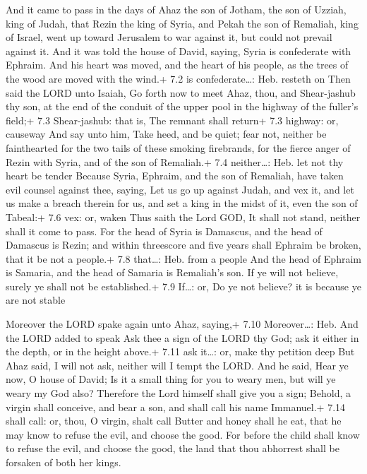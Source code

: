  And it came to pass in the days of Ahaz the son of Jotham,
the son of Uzziah, king of Judah, that Rezin the king of Syria, and
Pekah the son of Remaliah, king of Israel, went up toward Jerusalem to
war against it, but could not prevail against it.  And it
was told the house of David, saying, Syria is confederate with Ephraim.
And his heart was moved, and the heart of his people, as the trees of
the wood are moved with the wind.+ 7.2 is confederate\ldots: Heb.
resteth on  Then said the LORD unto Isaiah, Go forth now to
meet Ahaz, thou, and Shear-jashub thy son, at the end of the conduit of
the upper pool in the highway of the fuller's field;+ 7.3 Shear-jashub:
that is, The remnant shall return+ 7.3 highway: or, causeway
 And say unto him, Take heed, and be quiet; fear not,
neither be fainthearted for the two tails of these smoking firebrands,
for the fierce anger of Rezin with Syria, and of the son of Remaliah.+
7.4 neither\ldots: Heb. let not thy heart be tender  Because
Syria, Ephraim, and the son of Remaliah, have taken evil counsel against
thee, saying,  Let us go up against Judah, and vex it, and
let us make a breach therein for us, and set a king in the midst of it,
even the son of Tabeal:+ 7.6 vex: or, waken  Thus saith the
Lord GOD, It shall not stand, neither shall it come to pass.
 For the head of Syria is Damascus, and the head of Damascus
is Rezin; and within threescore and five years shall Ephraim be broken,
that it be not a people.+ 7.8 that\ldots: Heb. from a people
 And the head of Ephraim is Samaria, and the head of Samaria
is Remaliah's son. If ye will not believe, surely ye shall not be
established.+ 7.9 If\ldots: or, Do ye not believe? it is because ye are
not stable

 Moreover the LORD spake again unto Ahaz, saying,+ 7.10
Moreover\ldots: Heb. And the LORD added to speak  Ask thee
a sign of the LORD thy God; ask it either in the depth, or in the height
above.+ 7.11 ask it\ldots: or, make thy petition deep  But
Ahaz said, I will not ask, neither will I tempt the LORD. 
And he said, Hear ye now, O house of David; Is it a small thing for you
to weary men, but will ye weary my God also?  Therefore the
Lord himself shall give you a sign; Behold, a virgin shall conceive, and
bear a son, and shall call his name Immanuel.+ 7.14 shall call: or,
thou, O virgin, shalt call  Butter and honey shall he eat,
that he may know to refuse the evil, and choose the good. 
For before the child shall know to refuse the evil, and choose the good,
the land that thou abhorrest shall be forsaken of both her kings.

